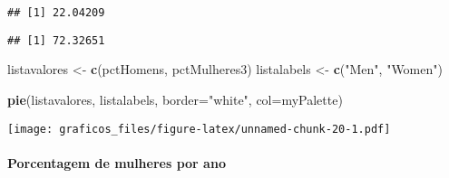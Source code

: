 \documentclass[
]{article}
\newenvironment{Shaded}{\begin{snugshade}}{\end{snugshade}}
\newcommand{\DataTypeTok}[1]{\textcolor[rgb]{0.13,0.29,0.53}{#1}}
\newcommand{\DecValTok}[1]{\textcolor[rgb]{0.00,0.00,0.81}{#1}}
\newcommand{\KeywordTok}[1]{\textcolor[rgb]{0.13,0.29,0.53}{\textbf{#1}}}
\newcommand{\NormalTok}[1]{#1}
\newcommand{\OperatorTok}[1]{\textcolor[rgb]{0.81,0.36,0.00}{\textbf{#1}}}
\newcommand{\StringTok}[1]{\textcolor[rgb]{0.31,0.60,0.02}{#1}}
\begin{document}
\begin{verbatim}
## [1] 22.04209
\end{verbatim}

\begin{Shaded}
\end{Shaded}

\begin{verbatim}
## [1] 72.32651
\end{verbatim}

\begin{Shaded}
\begin{Highlighting}[]
\NormalTok{listavalores <-}\StringTok{ }\KeywordTok{c}\NormalTok{(pctHomens, pctMulheres3)}
\NormalTok{listalabels <-}\StringTok{ }\KeywordTok{c}\NormalTok{(}\StringTok{"Men"}\NormalTok{, }\StringTok{"Women"}\NormalTok{)}


\KeywordTok{pie}\NormalTok{(listavalores, listalabels, }\DataTypeTok{border=}\StringTok{"white"}\NormalTok{, }\DataTypeTok{col=}\NormalTok{myPalette)}
\end{Highlighting}
\end{Shaded}

\texttt{[image: graficos\_files/figure-latex/unnamed-chunk-20-1.pdf]}

\hypertarget{porcentagem-de-mulheres-por-ano}{%
\paragraph{Porcentagem de mulheres por
ano}\label{porcentagem-de-mulheres-por-ano}}
\end{document}
